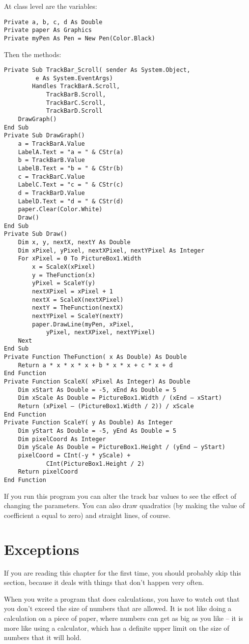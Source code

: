 		At class level are the variables:
		\begin{lstlisting}
Private a, b, c, d As Double
Private paper As Graphics
Private myPen As Pen = New Pen(Color.Black)
		\end{lstlisting}
Then the methods:
		\begin{lstlisting}
Private Sub TrackBar_Scroll( sender As System.Object,
		 e As System.EventArgs)
		Handles TrackBarA.Scroll,
			TrackBarB.Scroll,
			TrackBarC.Scroll,
			TrackBarD.Scroll
	DrawGraph()
End Sub
Private Sub DrawGraph()
	a = TrackBarA.Value
	LabelA.Text = "a = " & CStr(a)
	b = TrackBarB.Value
	LabelB.Text = "b = " & CStr(b)
	c = TrackBarC.Value
	LabelC.Text = "c = " & CStr(c)
	d = TrackBarD.Value
	LabelD.Text = "d = " & CStr(d)
	paper.Clear(Color.White)
	Draw()
End Sub
Private Sub Draw()
	Dim x, y, nextX, nextY As Double
	Dim xPixel, yPixel, nextXPixel, nextYPixel As Integer
	For xPixel = 0 To PictureBox1.Width
		x = ScaleX(xPixel)
		y = TheFunction(x)
		yPixel = ScaleY(y)
		nextXPixel = xPixel + 1
		nextX = ScaleX(nextXPixel)
		nextY = TheFunction(nextX)
		nextYPixel = ScaleY(nextY)
		paper.DrawLine(myPen, xPixel,
			yPixel, nextXPixel, nextYPixel)
	Next
End Sub
Private Function TheFunction( x As Double) As Double
	Return a * x * x * x + b * x * x + c * x + d
End Function
Private Function ScaleX( xPixel As Integer) As Double
	Dim xStart As Double = -5, xEnd As Double = 5
	Dim xScale As Double = PictureBox1.Width / (xEnd – xStart)
	Return (xPixel – (PictureBox1.Width / 2)) / xScale
End Function
Private Function ScaleY( y As Double) As Integer
	Dim yStart As Double = -5, yEnd As Double = 5
	Dim pixelCoord As Integer
	Dim yScale As Double = PictureBox1.Height / (yEnd – yStart)
	pixelCoord = CInt(-y * yScale) +
			CInt(PictureBox1.Height / 2)
	Return pixelCoord
End Function
		\end{lstlisting}
		If you run this program you can alter the track bar values to see the effect of changing the parameters. You can also draw quadratics (by making the value of coefficient a equal to zero) and straight lines, of course.


	\section{Exceptions}
		If you are reading this chapter for the first time, you should probably skip this section, because it deals with things that don't happen very often.
		
		When you write a program that does calculations, you have to watch out that you don't exceed the size of numbers that are allowed. It is not like doing a calculation on a piece of paper, where numbers can get as big as you like – it is more like using a calculator, which has a definite upper limit on the size of numbers that it will hold.
		
